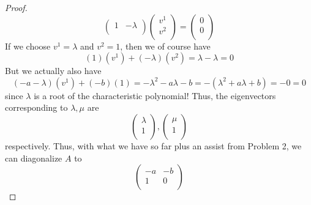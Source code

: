 \documentclass[../psets.tex]{subfiles}
\begin{document}
\begin{enumerate}
\begin{enumerate}
\begin{proof}
\begin{equation*}
\begin{pmatrix}
                    1 & -\lambda\\
                \end{pmatrix}
                \begin{pmatrix}
                    v^1\\
                    v^2\\
                \end{pmatrix}
                =
                \begin{pmatrix}
                    0\\
                    0\\
                \end{pmatrix}
            \end{equation*}
            If we choose $v^1=\lambda$ and $v^2=1$, then we of course have
            \begin{equation*}
                (1)(v^1)+(-\lambda)(v^2) = \lambda-\lambda
                = 0
            \end{equation*}
            But we actually also have
            \begin{equation*}
                (-a-\lambda)(v^1)+(-b)(1) = -\lambda^2-a\lambda-b
                = -(\lambda^2+a\lambda+b)
                = -0
                = 0
            \end{equation*}
            since $\lambda$ is a root of the characteristic polynomial! Thus, the eigenvectors corresponding to $\lambda,\mu$ are
            \begin{equation*}
                \begin{pmatrix}
                    \lambda\\
                    1\\
                \end{pmatrix},
                \begin{pmatrix}
                    \mu\\
                    1\\
                \end{pmatrix}
            \end{equation*}
            respectively. Thus, with what we have so far plus an assist from Problem 2, we can diagonalize $A$ to
            \begin{equation*}
                \begin{pmatrix}
                    -a & -b\\
                    1 & 0\\

\end{pmatrix}
\end{equation*}
\end{proof}
\end{enumerate}
\end{enumerate}
\end{document}
